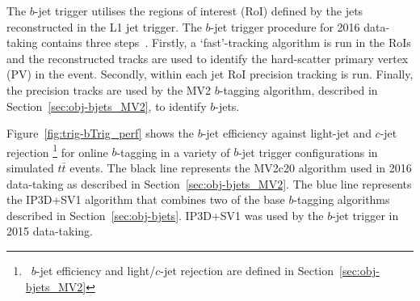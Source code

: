 The $b$-jet trigger utilises the regions of interest (RoI) defined by the jets reconstructed in the L1 jet trigger.
The $b$-jet trigger procedure for 2016 data-taking contains three steps~\cite{trig-bTrig_desc}.
Firstly, a `fast'-tracking algorithm is run in the RoIs and
the reconstructed tracks are used to identify the hard-scatter primary vertex (PV) in the event.
Secondly, within each jet RoI precision tracking is run.
Finally, the precision tracks are used by the MV2 $b$-tagging algorithm, described in Section~\ref{sec:obj-bjets_MV2}, to identify $b$-jets.

Figure~\ref{fig:trig-bTrig_perf} shows the $b$-jet efficiency against light-jet and $c$-jet rejection \footnote{\ $b$-jet efficiency and
  light/$c$-jet rejection are defined in Section~\ref{sec:obj-bjets_MV2}}
for online $b$-tagging in a variety of $b$-jet trigger configurations in simulated $t\bar{t}$ events.
The black line represents the MV2c20 algorithm used in 2016 data-taking as described in Section~\ref{sec:obj-bjets_MV2}.
The blue line represents the IP3D+SV1 algorithm that combines two of the base $b$-tagging algorithms described in Section~\ref{sec:obj-bjets}.
IP3D+SV1 was used by the $b$-jet trigger in 2015 data-taking.

